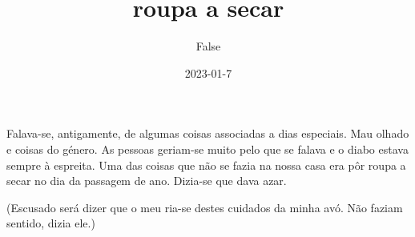 \documentclass{article}
\title{roupa a secar}
\author{False}
\date{2023-01-7}
\begin{document}
\maketitle

Falava-se, antigamente, de algumas coisas associadas a dias especiais. Mau olhado e coisas do género.
As pessoas geriam-se muito pelo que se falava e o diabo estava sempre à espreita.
Uma das coisas que não se fazia na nossa casa era pôr roupa a secar no dia da passagem de ano. Dizia-se que dava azar.

(Escusado será dizer que o meu  ria-se destes cuidados da minha avó. Não faziam sentido, dizia ele.)
 

\printindex
\end{document}

